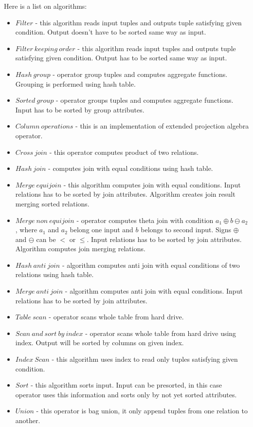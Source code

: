 Here is a list on algorithms:
\begin{itemize}
\item $Filter$ - this algorithm reads input tuples and outputs tuple satisfying given condition. Output doesn't have to be sorted same way as input.
\item $Filter~keeping~order$ - this algorithm reads input tuples and outputs tuple satisfying given condition. Output has to be sorted same way as input.
\item $Hash~group$ - operator group tuples and computes aggregate functions. Grouping is performed using hash table.
\item $Sorted~group$ - operator groups tuples and computes aggregate functions. Input has to be sorted by group attributes.
\item $Column~operations$ - this is an implementation of extended projection algebra operator. 
\item $Cross~join$ - this operator computes product of two relations.
\item $Hash~join$ - computes join with equal conditions using hash table. 
\item $Merge~equijoin$ - this algorithm computes join with equal conditions. Input relations has to be sorted by join attributes. Algorithm creates join result merging sorted relations.
\item $Merge~non~equijoin$ - operator computes theta join with condition $a_1\oplus b \ominus a_2$, where $a_1$ and $a_2$ belong one input and $b$ belongs to second input. Signs $\oplus$ and $\ominus$ can be $<$ or $\leq$. Input relations has to be sorted by join attributes. Algorithm computes join merging relations.
\item $Hash~anti~join$ -  algorithm computes anti join with equal conditions of two relations using hash table.
\item $Merge~anti~join$ - algorithm computes anti join with equal conditions. Input relations has to be sorted by join attributes.
\item $Table~scan$ - operator scans whole table from hard drive.
\item $Scan~and~sort~by~index$ - operator scans whole table from hard drive using index. Output will be sorted by columns on given index.
\item $Index~Scan$ - this algorithm uses index to read only tuples satisfying given condition.
\item $Sort$ - this algorithm sorts input. Input can be presorted, in this case operator uses this information and sorts only by not yet sorted attributes.
\item $Union$ - this operator is bag union, it only append tuples from one relation to another.

\end{itemize}


